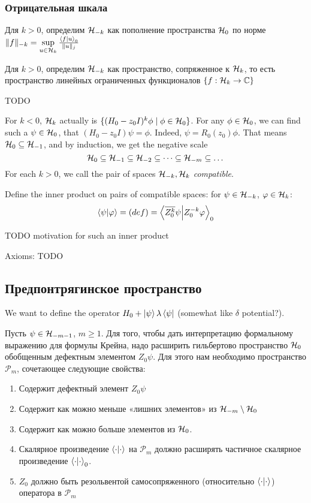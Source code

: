 \subsubsection{Отрицательная шкала}
Для $k > 0$, определим $\mathcal{H}_{-k}$ как пополнение пространства $\mathcal{H}_{0}$ по норме $\|f \|_{-k} = \sup\limits_{u \in \hilb{k}} \frac{\ip{f}{u}_0}{\|u\|_j}$

Для $k > 0$, определим $\mathcal{H}_{-k}$ как пространство, сопряженное к $\mathcal{H}_{k}$, то есть пространство линейных ограниченных функционалов $\{ f: \mathcal{H}_{k} \to \mathbb{C} \}$

TODO

For $k < 0$, $\mathcal{H}_{k}$ actually is $\{ (H_0 - z_0 I)^k \phi \mid \phi \in \mathcal{H}_{0} \}$.
For any $\phi \in \mathcal{H}_{0}$, we can find such a $\psi \in \mathcal{H}_{0}$, that $(H_0 - z_0 I) \psi = \phi$. Indeed, $\psi = R_0(z_0) \phi$. That means $\mathcal{H}_{0} \subseteq \mathcal{H}_{-1}$, and by induction, we get the negative scale
\[
\mathcal{H}_{0} \subseteq \mathcal{H}_{-1} \subseteq \mathcal{H}_{-2} \subseteq \dots \subseteq \mathcal{H}_{-m} \subseteq \dots
\] 
For each $k > 0$, we call the pair of spaces $\mathcal{H}_{-k}, \mathcal{H}_{k}$ \textit{compatible}.

Define the inner product on pairs of compatible spaces: for $\psi \in \mathcal{H}_{-k}$, $\varphi \in \mathcal{H}_{k}$:
\[
\ip{\psi}{\varphi} = (def) = \ip{\cconj{Z_0^k} \psi}{Z_0^{-k} \varphi}_0
\]

TODO motivation for such an inner product

Axioms: TODO




\subsection{Предпонтрягинское пространство}
We want to define the operator $H_0 + \ket{\psi} \lambda \bra{\psi}$ (somewhat like $\delta$ potential?).

Пусть $\psi \in \mathcal{H}_{-m - 1}$, $m \ge 1$. Для того, чтобы дать интерпретацию формальному выражению для формулы Крейна, надо расширить гильбертово пространство $\mathcal{H}_{0}$ обобщенным дефектным элементом $Z_0 \psi$. Для этого нам необходимо пространство $\mathcal{P}_m$, сочетающее следующие свойства:

\begin{enumerate}
\item Содержит дефектный элемент $Z_0 \psi$
\item Содержит как можно меньше «лишних элементов» из  $\mathcal{H}_{-m} \setminus \mathcal{H}_{0}$
\item Содержит как можно больше элементов из $\mathcal{H}_{0}$.
\item Скалярное произведение $\ip{\cdot}{\cdot}$ на $\mathcal{P}_m$ должно расширять частичное скалярное произведение $\ip{\cdot}{\cdot}_0$.
\item $Z_0$ должно быть резольвентой самосопряженного (относительно $\ip{\cdot}{\cdot}$) оператора в $\mathcal{P}_m$
\end{enumerate}

